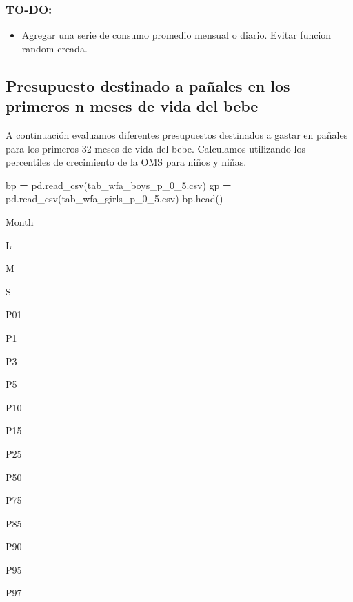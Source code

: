 \documentclass[
]{article}
\newenvironment{Shaded}{\begin{snugshade}}{\end{snugshade}}
\newcommand{\NormalTok}[1]{#1}
\newcommand{\OperatorTok}[1]{\textcolor[rgb]{0.81,0.36,0.00}{\textbf{#1}}}
\newcommand{\StringTok}[1]{\textcolor[rgb]{0.31,0.60,0.02}{#1}}
\providecommand{\tightlist}{%
  \setlength{\itemsep}{0pt}\setlength{\parskip}{0pt}}
\begin{document}
\hypertarget{to-do}{%
\subsubsection{TO-DO:}\label{to-do}}

\begin{itemize}
\tightlist
\item
  Agregar una serie de consumo promedio mensual o diario. Evitar funcion
  random creada.
\end{itemize}

\hypertarget{presupuesto-destinado-a-pauxf1ales-en-los-primeros-n-meses-de-vida-del-bebe}{%
\subsection{Presupuesto destinado a pañales en los primeros n meses de
vida del
bebe}\label{presupuesto-destinado-a-pauxf1ales-en-los-primeros-n-meses-de-vida-del-bebe}}

A continuación evaluamos diferentes presupuestos destinados a gastar en
pañales para los primeros 32 meses de vida del bebe. Calculamos
utilizando los percentiles de crecimiento de la OMS para niños y niñas.

\begin{Shaded}
\begin{Highlighting}[]
\NormalTok{bp }\OperatorTok{=}\NormalTok{ pd.read\_csv(}\StringTok{\textquotesingle{}tab\_wfa\_boys\_p\_0\_5.csv\textquotesingle{}}\NormalTok{)}
\NormalTok{gp }\OperatorTok{=}\NormalTok{ pd.read\_csv(}\StringTok{\textquotesingle{}tab\_wfa\_girls\_p\_0\_5.csv\textquotesingle{}}\NormalTok{)}
\NormalTok{bp.head()}
\end{Highlighting}
\end{Shaded}

Month

L

M

S

P01

P1

P3

P5

P10

P15

P25

P50

P75

P85

P90

P95

P97
\end{document}
